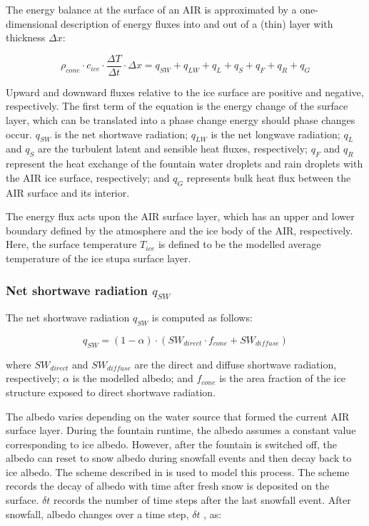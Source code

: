 The energy balance at the surface of an \ac{AIR} is approximated by a one-dimensional description of energy fluxes
into and out of a (thin) layer with thickness $\Delta x$:

\begin{equation}
	\rho_{cone} \cdot c_{ice} \cdot \frac{\Delta T}{\Delta t} \cdot \Delta x = q_{SW} + q_{LW} + q_{L} + q_{S} + q_{F}+ q_{R} + q_{G}
	\label{eqn:EB}
\end{equation}

Upward and downward fluxes relative to the ice surface are positive and negative, respectively. The first term
of the equation is the energy change of the surface layer, which can be translated into a phase change energy should phase
changes occur. $q_{SW}$ is the net shortwave radiation; $q_{LW}$ is the net longwave radiation; $q_{L}$ and
$q_{S}$ are the turbulent latent and sensible heat fluxes, respectively; $q_{F}$ and $q_{R}$ represent the heat exchange of
the fountain water droplets and rain droplets with the \ac{AIR} ice surface, respectively; and $q_{G}$ represents bulk
heat flux between the \ac{AIR} surface and its interior.

The energy flux acts upon the \ac{AIR} surface layer, which has an upper and lower boundary defined by the atmosphere
and the ice body of the \ac{AIR}, respectively. Here, the surface temperature $T_{ice}$ is defined to be the modelled
average temperature of the ice stupa surface layer.

\subsubsection{Net shortwave radiation \texorpdfstring{$q_{SW}$}{Lg}}

The net shortwave radiation $q_{SW}$ is computed as follows:

\begin{equation} q_{SW} = (1- \alpha)\cdot (SW_{direct} \cdot f_{cone} + SW_{diffuse}) \label{eqn:SW} \end{equation}

where $SW_{direct}$ and $SW_{diffuse}$ are the direct and diffuse shortwave radiation, respectively; $\alpha$ is the
modelled albedo; and $f_{cone}$ is the area fraction of the ice structure exposed to direct shortwave
radiation.

The albedo varies depending on the water source that formed the current \ac{AIR} surface layer. During the fountain
runtime, the albedo assumes a constant value corresponding to ice albedo. However, after the fountain is
switched off, the albedo can reset to snow albedo during snowfall events and then decay back to ice albedo. The scheme described in \cite{oerlemansYearRecordGlobal1998} is used to model this process. The scheme records the
decay of albedo with time after fresh snow is deposited on the surface. $\delta t$ records the number of time
steps after the last snowfall event. After snowfall, albedo changes over a time step, $\delta t$ , as:

